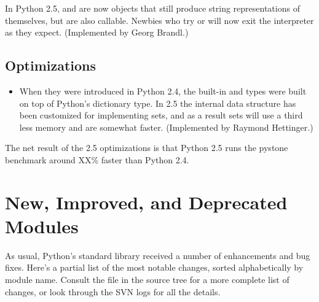 \documentclass{howto}
\begin{document}
In Python 2.5,  and  are now objects that still
produce string representations of themselves, but are also callable.
Newbies who try  or  will now exit the
interpreter as they expect.  (Implemented by Georg Brandl.)


\subsection{Optimizations}

\begin{itemize}

\item When they were introduced 
in Python 2.4, the built-in  and  types
were built on top of Python's dictionary type.  
In 2.5 the internal data structure has been customized for implementing sets,
and as a result sets will use a third less memory and are somewhat faster.
(Implemented by Raymond Hettinger.)

\end{itemize}

The net result of the 2.5 optimizations is that Python 2.5 runs the
pystone benchmark around XX\% faster than Python 2.4.


\section{New, Improved, and Deprecated Modules}

As usual, Python's standard library received a number of enhancements and
bug fixes.  Here's a partial list of the most notable changes, sorted
alphabetically by module name. Consult the
 file in the source tree for a more
complete list of changes, or look through the SVN logs for all the
details.
\end{document}
